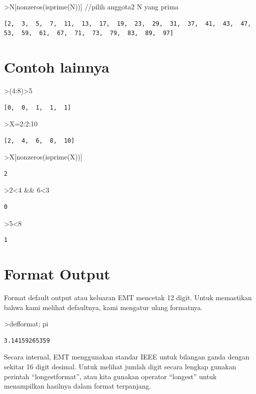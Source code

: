 \documentclass[
]{book}
\begin{document}
\textgreater N{[}nonzeros(isprime(N)){]} //pilih anggota2 N yang prima

\begin{verbatim}
[2,  3,  5,  7,  11,  13,  17,  19,  23,  29,  31,  37,  41,  43,  47,
53,  59,  61,  67,  71,  73,  79,  83,  89,  97]
\end{verbatim}

\section{Contoh lainnya}\label{contoh-lainnya-4}

\textgreater(4:8)\textgreater5

\begin{verbatim}
[0,  0,  1,  1,  1]
\end{verbatim}

\textgreater X=2:2:10

\begin{verbatim}
[2,  4,  6,  8,  10]
\end{verbatim}

\textgreater X{[}nonzeros(isprime(X)){]}

\begin{verbatim}
2
\end{verbatim}

\textgreater2\textless4 \&\& 6\textless3

\begin{verbatim}
0
\end{verbatim}

\textgreater5\textless8

\begin{verbatim}
1
\end{verbatim}

\section{Format Output}\label{format-output}

Format default output atau keluaran EMT mencetak 12 digit. Untuk memastikan bahwa kami melihat defaultnya, kami mengatur ulang formatnya.

\textgreater defformat; pi

\begin{verbatim}
3.14159265359
\end{verbatim}

Secara internal, EMT menggunakan standar IEEE untuk bilangan ganda dengan sekitar 16 digit desimal. Untuk melihat jumlah digit secara lengkap gunakan perintah ``longestformat'', atau kita gunakan operator ``longest'' untuk menampilkan hasilnya dalam format terpanjang.
\end{document}
